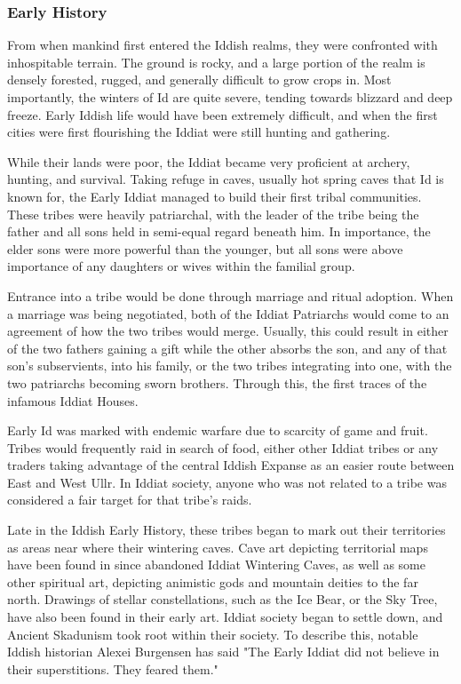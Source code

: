 		\subsubsection{Early History}\par
			From when mankind first entered the Iddish realms, they were confronted with inhospitable terrain. The ground is rocky, and a large portion of the realm is densely forested, rugged, and generally difficult to grow crops in. Most importantly, the winters of Id are quite severe, tending towards blizzard and deep freeze. Early Iddish life would have been extremely difficult, and when the first cities were first flourishing the Iddiat were still hunting and gathering.\par
			While their lands were poor, the Iddiat became very proficient at archery, hunting, and survival. Taking refuge in caves, usually hot spring caves that Id is known for, the Early Iddiat managed to build their first tribal communities. These tribes were heavily patriarchal, with the leader of the tribe being the father and all sons held in semi-equal regard beneath him. In importance, the elder sons were more powerful than the younger, but all sons were above importance of any daughters or wives within the familial group.\par 
			Entrance into a tribe would be done through marriage and ritual adoption. When a marriage was being negotiated, both of the Iddiat Patriarchs would come to an agreement of how the two tribes would merge. Usually, this could result in either of the two fathers gaining a gift while the other absorbs the son, and any of that son's subservients, into his family, or the two tribes integrating into one, with the two patriarchs becoming sworn brothers. Through this, the first traces of the infamous Iddiat Houses.\par
			Early Id was marked with endemic warfare due to scarcity of game and fruit. Tribes would frequently raid in search of food, either other Iddiat tribes or any traders taking advantage of the central Iddish Expanse as an easier route between East and West Ullr. In Iddiat society, anyone who was not related to a tribe was considered a fair target for that tribe's raids.\par 
			Late in the Iddish Early History, these tribes began to mark out their territories as areas near where their wintering caves. Cave art depicting territorial maps have been found in since abandoned Iddiat Wintering Caves, as well as some other spiritual art, depicting animistic gods and mountain deities to the far north. Drawings of stellar constellations, such as the Ice Bear, or the Sky Tree, have also been found in their early art. Iddiat society began to settle down, and Ancient Skadunism took root within their society. To describe this, notable Iddish historian Alexei Burgensen has said "The Early Iddiat did not believe in their superstitions. They feared them."\par
